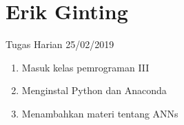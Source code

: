 \chapter{Erik Ginting}

Tugas Harian 25/02/2019
\begin{enumerate}
  \item Masuk kelas pemrograman III
  \item Menginstal Python dan Anaconda
  \item Menambahkan materi tentang ANNs
\end{enumerate}


